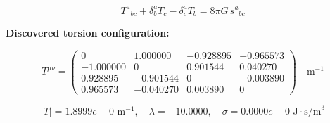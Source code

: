 
\begin{equation}
  T^a{}_{bc} + \delta^a_b T_c - \delta^a_c T_b = 8\pi G \, s^a{}_{bc}
\end{equation}

\textbf{Discovered torsion configuration:}

\begin{equation}
  T^{\mu\nu} = \begin{pmatrix}
    0 & 1.000000 & -0.928895 & -0.965573 \\
    -1.000000 & 0 & 0.901544 & 0.040270 \\
    0.928895 & -0.901544 & 0 & -0.003890 \\
    0.965573 & -0.040270 & 0.003890 & 0
  \end{pmatrix} \quad \text{m}^{-1}
\end{equation}

\begin{equation}
  |T| = 1.8999e+0 \text{ m}^{-1}, \quad
  \lambda = -10.0000, \quad
  \sigma = 0.0000e+0 \text{ J}\cdot\text{s/m}^3
\end{equation}